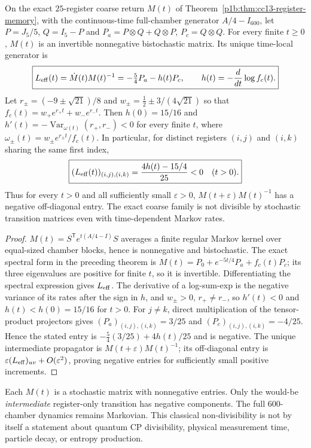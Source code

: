 \documentclass[11pt]{article}
\begin{document}
\begin{theorem}
\label{p1b:thm:cc14-no-time-local-markov}
On the exact $25$-register coarse return $M(t)$ of
Theorem~\ref{p1b:thm:cc13-register-memory}, with the continuous-time
full-chamber generator $A/4-I_{600}$, let
$P=J_5/5$, $Q=I_5-P$ and
$P_a=P\otimes Q+Q\otimes P$, $P_c=Q\otimes Q$.
For every finite $t\ge0$, $M(t)$ is an invertible nonnegative
bistochastic matrix.  Its unique time-local generator is
\[
 \boxed{L_{\rm eff}(t)=\dot M(t)M(t)^{-1}
 =-\tfrac54P_a-h(t)P_c,\qquad
 h(t)=-\frac{d}{dt}\log f_c(t).}
\]
Let $r_\pm=(-9\pm\sqrt{21})/8$ and
$w_\pm=\tfrac12\pm3/(4\sqrt{21})$ so that
$f_c(t)=w_+e^{r_+t}+w_-e^{r_-t}$.  Then $h(0)=15/16$ and
$h'(t)=-\operatorname{Var}_{\omega(t)}(r_+,r_-)<0$
for every finite $t$, where
$\omega_\pm(t)=w_\pm e^{r_\pm t}/f_c(t)$.
In particular, for distinct registers $(i,j)$ and $(i,k)$
sharing the same first index,
\[
 \boxed{(L_{\rm eff}(t))_{(i,j),(i,k)}
 =\frac{4h(t)-15/4}{25}<0\quad(t>0).}
\]
Thus for every $t>0$ and all sufficiently small $\varepsilon>0$,
$M(t+\varepsilon)M(t)^{-1}$ has a negative off-diagonal entry.
The exact coarse family is not divisible by stochastic transition
matrices even with time-dependent Markov rates.
\end{theorem}
\begin{proof}
$M(t)=S^{\mathsf T}e^{t(A/4-I)}S$ averages a finite regular
Markov kernel over equal-sized chamber blocks, hence is
nonnegative and bistochastic.  The exact spectral form in the
preceding theorem is
$M(t)=P_0+e^{-5t/4}P_a+f_c(t)P_c$; its three
eigenvalues are positive for finite $t$, so it is invertible.
Differentiating the spectral expression gives $L_{\rm eff}$.
The derivative of a log-sum-exp is the negative variance of its
rates after the sign in $h$, and $w_\pm>0$, $r_+\ne r_-$,
so $h'(t)<0$ and $h(t)<h(0)=15/16$ for $t>0$.
For $j\ne k$, direct multiplication of the tensor-product
projectors gives $(P_a)_{(i,j),(i,k)}=3/25$ and
$(P_c)_{(i,j),(i,k)}=-4/25$.  Hence the stated entry is
$-\frac54(3/25)+4h(t)/25$ and is negative.
The unique intermediate propagator is $M(t+\varepsilon)M(t)^{-1}$;
its off-diagonal entry is $\varepsilon (L_{\rm eff})_{uv}
+O(\varepsilon^2)$, proving negative entries for sufficiently
small positive increments.
\end{proof}
\begin{remark}
Each $M(t)$ is a stochastic matrix with nonnegative entries.
Only the would-be \emph{intermediate} register-only transition has
negative components.  The full $600$-chamber dynamics remains
Markovian.  This classical non-divisibility is not by itself a
statement about quantum CP divisibility, physical measurement time,
particle decay, or entropy production.
\end{remark}
\end{document}
